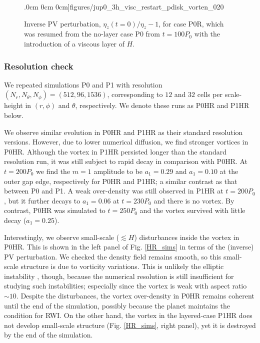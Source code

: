 \begin{figure}
    .0cm 0cm 0cm]{figures/jup0_3h_visc_restart_pdisk_vorten_020}
  \caption{Inverse PV perturbation, $\eta_z(t=0)/\eta_z - 1$, for case P0R, which was resumed
    from the no-layer case P0 from $t=100P_0$ with the introduction of
    a viscous layer of $H$. 
    \label{jup0_3h_visc_restart_vorten}}
\end{figure}

\subsubsection{Resolution check}%
We repeated simulations P0 and P1 with resolution
$(N_r,N_\theta,N_\phi)=(512,96,1536)$, corresponding
to $12$ and $32$ cells per scale-height in $(r,\phi)$ and $\theta$,
respectively. We denote these runs as P0HR and P1HR below. 

We observe similar evolution in P0HR and P1HR as their standard
resolution versions. However, due to lower numerical diffusion, we
find stronger vortices in P0HR. Although the vortex in P1HR persisted
longer than the standard resolution run, it was still subject to rapid
decay in comparison with P0HR. At $t=200P_0$ we find 
the $m=1$ amplitude to be $a_1=0.29$ and $a_1=0.10$ at the outer gap
edge, respectively for P0HR and P1HR; a similar contrast as that
between P0 and P1. A weak over-density was still observed in
P1HR at $t=200P_0$, but it further decays to $a_1=0.06$ at $t=230P_0$
and there is no vortex. By contrast, P0HR was simulated to $t=250P_0$
and the vortex survived with little decay ($a_1=0.25$).   
  
Interestingly, we observe small-scale ($\lesssim H$) disturbances inside the
vortex in P0HR. This is shown in the left panel of  
Fig. \ref{HR_sims} in terms of the (inverse) PV perturbation. We
checked the density field remains smooth, so this small-scale structure is
due to vorticity variations. This is unlikely the elliptic instability
\citep{lesur09}, though, because the numerical resolution is still
insufficient for studying such instabilities; especially since the vortex is weak  with aspect ratio
$\sim 10$. Despite the disturbances, the vortex over-density in P0HR remains coherent until the
end of the simulation, possibly because the planet maintains the 
condition for RWI. On the other hand, the vortex in the layered-case
P1HR does not develop small-scale structure (Fig. \ref{HR_sims}, right
panel), yet it is destroyed by the end of the simulation.  

